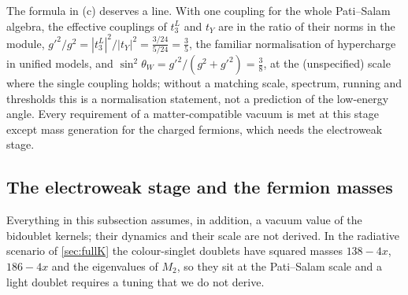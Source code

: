 The formula in (c) deserves a line. With one coupling for the whole Pati--Salam algebra, the effective couplings of $t^L_3$ and $t_Y$ are in the ratio of
their norms in the module, $g'^2/g^2=|t^L_3|^2/|t_Y|^2=\tfrac{3/24}{5/24}=\tfrac35$, the familiar normalisation of hypercharge in unified models, and
$\sin^2\theta_W=g'^2/(g^2+g'^2)=\tfrac38$, at the (unspecified) scale where the single coupling holds; without a matching scale, spectrum, running and
thresholds this is a normalisation statement, not a prediction of the low-energy angle. Every requirement of a matter-compatible vacuum is met at this stage except mass
generation for the charged fermions, which needs the electroweak stage.

\subsection{The electroweak stage and the fermion masses}

Everything in this subsection assumes, in addition, a vacuum value of the bidoublet kernels; their dynamics and their scale are not derived. In the radiative
scenario of \cref{sec:fullK} the colour-singlet doublets have squared masses $138-4x$, $186-4x$ and the eigenvalues of $M_2$, so they sit at the Pati--Salam
scale and a light doublet requires a tuning that we do not derive.

